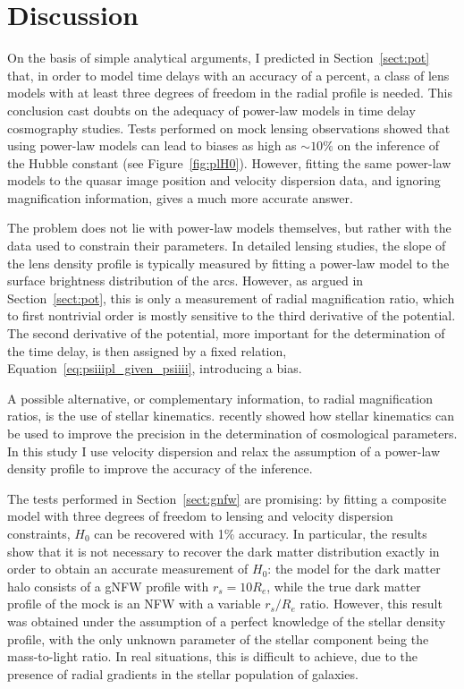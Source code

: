 \documentclass[usenatbib]{mnras}
\def\reff{R_e}
\def\Sref#1{Section~\ref{#1}\xspace}
\def\Fref#1{Figure~\ref{#1}\xspace}
\def\Eref#1{Equation~\ref{#1}\xspace}
\begin{document}
\section{Discussion}\label{sect:discuss}

On the basis of simple analytical arguments, I predicted in \Sref{sect:pot} that, in order to model time delays with an accuracy of a percent, a class of lens models with at least three degrees of freedom in the radial profile is needed.
This conclusion cast doubts on the adequacy of power-law models in time delay cosmography studies.
Tests performed on mock lensing observations showed that using power-law models can lead to biases as high as $\sim10\%$ on the inference of the Hubble constant (see \Fref{fig:plH0}).
However, 
fitting the same power-law models to the quasar image position and velocity dispersion data, and ignoring magnification information, gives a much more accurate answer.

The problem does not lie with power-law models themselves, but rather with the data used to constrain their parameters.
In detailed lensing studies, the slope of the lens density profile is typically measured by fitting a power-law model to the surface brightness distribution of the arcs.
However, as argued in \Sref{sect:pot}, this is only a measurement of radial magnification ratio, which to first nontrivial order is mostly sensitive to the third derivative of the potential.
The second derivative of the potential, more important for the determination of the time delay, is then assigned by a fixed relation, \Eref{eq:psiiipl_given_psiiii}, introducing a bias.

A possible alternative, or complementary information, to radial magnification ratios, is the use of stellar kinematics.
\cite{STA17} recently showed how stellar kinematics can be used to improve the precision in the determination of cosmological parameters.
In this study I use velocity dispersion and relax the assumption of a power-law density profile to improve the accuracy of the inference.

The tests performed in \Sref{sect:gnfw} are promising: by fitting a composite model with three degrees of freedom to lensing and velocity dispersion constraints, $H_0$ can be recovered with 1\% accuracy.
In particular, the results show that it is not necessary to recover the dark matter distribution exactly in order to obtain an accurate measurement of $H_0$: the model for the dark matter halo consists of a gNFW profile with $r_s=10\reff$, while the true dark matter profile of the mock is an NFW with a variable $r_s/\reff$ ratio.
However, this result was obtained under the assumption of a perfect knowledge of the stellar density profile, with the only unknown parameter of the stellar component being the mass-to-light ratio.
In real situations, this is difficult to achieve, due to the presence of radial gradients in the stellar population of galaxies.
\end{document}
